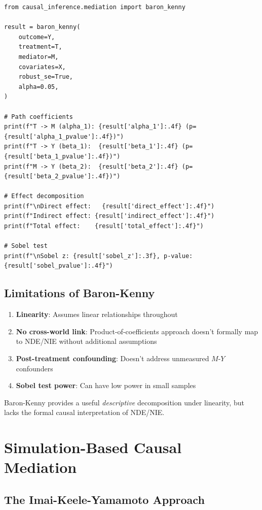\begin{verbatim}
from causal_inference.mediation import baron_kenny

result = baron_kenny(
    outcome=Y,
    treatment=T,
    mediator=M,
    covariates=X,
    robust_se=True,
    alpha=0.05,
)

# Path coefficients
print(f"T -> M (alpha_1): {result['alpha_1']:.4f} (p={result['alpha_1_pvalue']:.4f})")
print(f"T -> Y (beta_1):  {result['beta_1']:.4f} (p={result['beta_1_pvalue']:.4f})")
print(f"M -> Y (beta_2):  {result['beta_2']:.4f} (p={result['beta_2_pvalue']:.4f})")

# Effect decomposition
print(f"\nDirect effect:   {result['direct_effect']:.4f}")
print(f"Indirect effect: {result['indirect_effect']:.4f}")
print(f"Total effect:    {result['total_effect']:.4f}")

# Sobel test
print(f"\nSobel z: {result['sobel_z']:.3f}, p-value: {result['sobel_pvalue']:.4f}")
\end{verbatim}

\subsection{Limitations of Baron-Kenny}

\begin{enumerate}
\item \textbf{Linearity}: Assumes linear relationships throughout
\item \textbf{No cross-world link}: Product-of-coefficients approach doesn't formally map to NDE/NIE without additional assumptions
\item \textbf{Post-treatment confounding}: Doesn't address unmeasured $M$-$Y$ confounders
\item \textbf{Sobel test power}: Can have low power in small samples
\end{enumerate}

Baron-Kenny provides a useful \textit{descriptive} decomposition under linearity, but lacks the formal causal interpretation of NDE/NIE.


\section{Simulation-Based Causal Mediation}

\subsection{The Imai-Keele-Yamamoto Approach}

